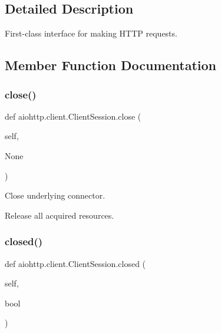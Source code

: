 \subsection{Detailed Description}
\begin{DoxyVerb}First-class interface for making HTTP requests.\end{DoxyVerb}
 

\subsection{Member Function Documentation}
\mbox{\label{classaiohttp_1_1client_1_1_client_session_af9d3ae9648b4e205f7d689285c6640e1}} 
\subsubsection{\texorpdfstring{close()}{close()}}
{\footnotesize\ttfamily def aiohttp.\+client.\+Client\+Session.\+close (\begin{DoxyParamCaption}\item[{}]{self,  }\item[{}]{None }\end{DoxyParamCaption})}

\begin{DoxyVerb}Close underlying connector.

Release all acquired resources.
\end{DoxyVerb}
 \mbox{\label{classaiohttp_1_1client_1_1_client_session_a8c32c38a78683da779a4ae431ad0f924}} 
\subsubsection{\texorpdfstring{closed()}{closed()}}
{\footnotesize\ttfamily def aiohttp.\+client.\+Client\+Session.\+closed (\begin{DoxyParamCaption}\item[{}]{self,  }\item[{}]{bool }\end{DoxyParamCaption})}

